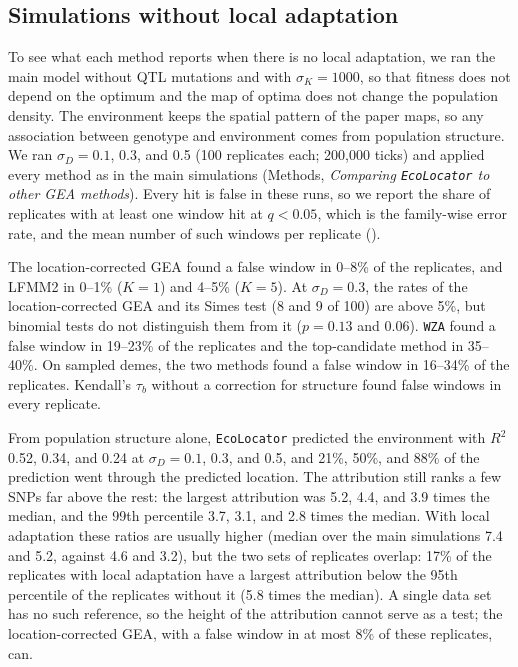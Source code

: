 \documentclass[]{article}
\newcommand{\ecolocator}{\texttt{EcoLocator}\xspace}
\begin{document}
\subsection*{Simulations without local adaptation}

To see what each method reports when there is no local adaptation,
we ran the main model without QTL mutations
and with $\sigma_K = 1000$,
so that fitness does not depend on the optimum
and the map of optima does not change the population density.
The environment keeps the spatial pattern of the paper maps,
so any association between genotype and environment
comes from population structure.
We ran $\sigma_D = 0.1$, 0.3, and 0.5
(100 replicates each; 200,000 ticks)
and applied every method as in the main simulations
(Methods, \textit{Comparing \ecolocator to other GEA methods}).
Every hit is false in these runs,
so we report the share of replicates
with at least one window hit at $q < 0.05$,
which is the family-wise error rate,
and the mean number of such windows per replicate
().

The location-corrected GEA found a false window
in 0--8\% of the replicates,
and LFMM2 in 0--1\% ($K = 1$) and 4--5\% ($K = 5$).
At $\sigma_D = 0.3$, the rates of the location-corrected GEA
and its Simes test (8 and 9 of 100) are above 5\%,
but binomial tests do not distinguish them from it
($p = 0.13$ and 0.06).
\texttt{WZA} found a false window in 19--23\% of the replicates
and the top-candidate method in 35--40\%.
On sampled demes, the two methods found a false window
in 16--34\% of the replicates.
Kendall's $\tau_b$ without a correction for structure
found false windows in every replicate.

From population structure alone,
\ecolocator predicted the environment
with $R^2$ 0.52, 0.34, and 0.24 at $\sigma_D = 0.1$, 0.3, and 0.5,
and 21\%, 50\%, and 88\% of the prediction
went through the predicted location.
The attribution still ranks a few SNPs far above the rest:
the largest attribution was 5.2, 4.4, and 3.9 times the median,
and the 99th percentile 3.7, 3.1, and 2.8 times the median.
With local adaptation these ratios are usually higher
(median over the main simulations 7.4 and 5.2, against 4.6 and 3.2),
but the two sets of replicates overlap:
17\% of the replicates with local adaptation
have a largest attribution below the 95th percentile
of the replicates without it (5.8 times the median).
A single data set has no such reference,
so the height of the attribution cannot serve as a test;
the location-corrected GEA, with a false window
in at most 8\% of these replicates, can.
\end{document}
